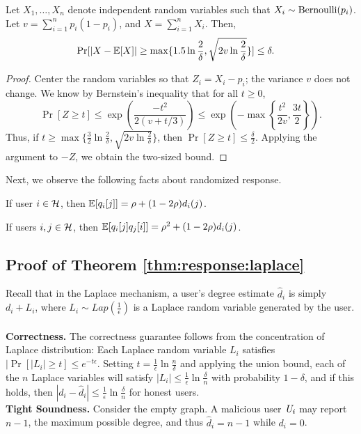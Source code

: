 \begin{lemma}\label{lem:bern-concentration}
    Let $X_1, \ldots, X_n$ denote independent random variables such that $X_i \sim \textnormal{Bernoulli}(p_i)$. Let $v = \sum_{i=1}^n p_i(1-p_i)$, and $X = \sum_{i=1}^n X_i$. Then,
    \begin{align*}
        \Pr[|X - \operatorname{\mathbb{E}}[X]| \geq \max\{1.5 \ln \frac{2}{\delta}, \sqrt{2v\ln \frac{2}{\delta}}\}] &\leq \delta.
    \end{align*}
\end{lemma}
\begin{proof}
    Center the random variables so that $Z_i = X_i - p_i$; the variance $v$ does not change. We know by Bernstein's inequality that for all $t \geq 0$,
    \[
        \Pr[Z \geq t] \leq \exp\left(\frac{-t^2}{2(v + t / 3)}\right) \leq \exp\left(- \max \left\{ \frac{t^2}{2v}, \frac{3t}{2}\right\}\right).
    \]
    Thus, if $t \geq \max\{\frac{3}{2} \ln \frac{2}{\delta}, \sqrt{2 v \ln \frac{2}{\delta}}\}$, then $\Pr[Z \geq t] \leq \frac{\delta}{2}$. Applying the argument to $-Z$, we obtain the two-sized bound.
    
\end{proof}

Next, we observe the following facts about randomized response.
\begin{fact}\label{fact:rr-exp}
If user $i \in \mathcal{H}$, then $\operatorname{\mathbb{E}}[q_i[j]] = \rho + (1-2\rho) d_i(j)$.
\end{fact}

\begin{fact}\label{fact:2rr-exp}
If users $i,j \in \mathcal{H}$, then $\operatorname{\mathbb{E}}[q_i[j]q_j[i]] = \rho^2 + (1-2\rho) d_i(j)$.
\end{fact}
\subsection{Proof of Theorem \ref{thm:response:laplace}}\label{app:thm:response:laplace}
Recall that in the Laplace mechanism, a user's degree estimate $\hat{d}_i$ is simply $d_i + L_i$, where $L_i \sim Lap(\frac{1}{\epsilon})$ is a Laplace random variable generated by the user.\\\\\noindent
\textbf{Correctness.} The correctness guarantee follows from the concentration of Laplace distribution: Each Laplace random variable $L_i$ satisfies $|\Pr[|L_i| \geq t] \leq e^{-t\epsilon}$. Setting $t = \frac{1}{\epsilon}\ln \frac{n}{\delta}$ and applying the union bound, each of the $n$ Laplace variables will satisfy $|L_i| \leq \frac{1}{\epsilon}\ln \frac{\delta}{n}$ with probability $1-\delta$, and if this holds, then $|d_i - \hat{d}_i| \leq \frac{1}{\epsilon}\ln \frac{\delta}{n}$ for honest users.
\\
\noindent\textbf{Tight Soundness.} Consider the empty graph. A malicious user $\textit{U}_i$ may report $n-1$, the maximum possible degree, and thus $\hat{d}_i = n-1$ while $d_i = 0$.

